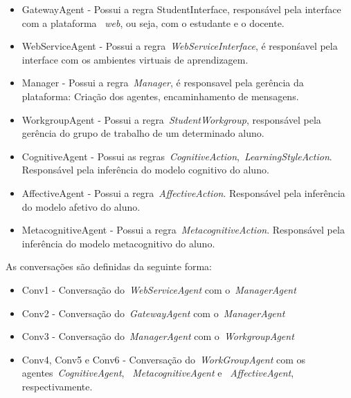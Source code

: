 \begin{itemize}
	\item GatewayAgent - Possui a regra StudentInterface, responsável pela interface com a plataforma ~\emph{web}, ou seja, com o estudante e o docente.
	\item WebServiceAgent - Possui a regra~\emph{WebServiceInterface}, é responśavel pela interface com os ambientes virtuais de aprendizagem.
	\item Manager - Possui a regra~\emph{Manager}, é responsavel pela gerência da plataforma: Criação dos agentes, encaminhamento de mensagens.
	\item WorkgroupAgent - Possui a regra~\emph{StudentWorkgroup}, responsável pela gerência do grupo de trabalho de um determinado aluno.
	\item CognitiveAgent - Possui as regras~\emph{CognitiveAction},~\emph{LearningStyleAction}. Responsável pela inferência do modelo cognitivo do aluno.
	\item AffectiveAgent - Possui a regra~\emph{AffectiveAction}. Responsável pela inferência do modelo afetivo do aluno.
	\item MetacognitiveAgent - Possui a regra~\emph{MetacognitiveAction}. Responsável pela inferência do modelo metacognitivo do aluno.
\end{itemize}

As conversações são definidas da seguinte forma:
\begin{itemize}
	\item Conv1 - Conversação do~\emph{WebServiceAgent} com o~\emph{ManagerAgent}
	\item Conv2 - Conversação do~\emph{GatewayAgent} com o~\emph{ManagerAgent}
	\item Conv3 - Conversação do~\emph{ManagerAgent} com o~\emph{WorkgroupAgent}
	\item Conv4, Conv5 e Conv6 - Conversação do~\emph{WorkGroupAgent} com os agentes~\emph{CognitiveAgent}, ~\emph{MetacognitiveAgent} e ~\emph{AffectiveAgent}, respectivamente.
\end{itemize}

